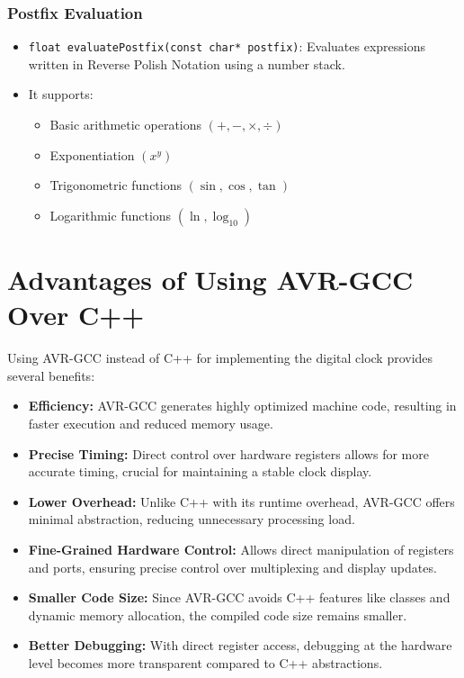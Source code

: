 \documentclass[a4paper,12pt]{article}
\theoremstyle{remark}
\begin{document}
\subsubsection{Postfix Evaluation}
\begin{itemize}
    \item \texttt{float evaluatePostfix(const char* postfix)}: Evaluates expressions written in Reverse Polish Notation using a number stack.  
    \item It supports:
    \begin{itemize}
        \item Basic arithmetic operations $(+, -, \times, \div)$  
        \item Exponentiation $(x^y)$  
        \item Trigonometric functions $(\sin, \cos, \tan)$  
        \item Logarithmic functions $(\ln, \log_{10})$  
    \end{itemize}
\end{itemize}




 

\section{Advantages of Using AVR-GCC Over C++}
Using AVR-GCC instead of C++ for implementing the digital clock provides several benefits:

\begin{itemize}
    \item \textbf{Efficiency:} AVR-GCC generates highly optimized machine code, resulting in faster execution and reduced memory usage.
    \item \textbf{Precise Timing:} Direct control over hardware registers allows for more accurate timing, crucial for maintaining a stable clock display.
    \item \textbf{Lower Overhead:} Unlike C++ with its runtime overhead, AVR-GCC offers minimal abstraction, reducing unnecessary processing load.
    \item \textbf{Fine-Grained Hardware Control:} Allows direct manipulation of registers and ports, ensuring precise control over multiplexing and display updates.
    \item \textbf{Smaller Code Size:} Since AVR-GCC avoids C++ features like classes and dynamic memory allocation, the compiled code size remains smaller.
    \item \textbf{Better Debugging:} With direct register access, debugging at the hardware level becomes more transparent compared to C++ abstractions.
\end{itemize}
\end{document}

